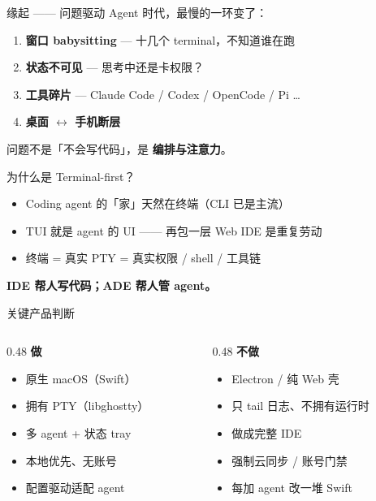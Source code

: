 \documentclass[aspectratio=169,10pt,UTF8]{ctexbeamer}
\begin{document}
\begin{frame}{缘起 —— 问题驱动}
  Agent 时代，最慢的一环变了：
  \begin{enumerate}
    \item \textbf{窗口 babysitting} — 十几个 terminal，不知道谁在跑
    \item \textbf{状态不可见} — 思考中还是卡权限？
    \item \textbf{工具碎片} — Claude Code / Codex / OpenCode / Pi \ldots
    \item \textbf{桌面 $\leftrightarrow$ 手机断层}
  \end{enumerate}
  \vspace{0.5em}
  \centering 问题不是「不会写代码」，是 \textbf{编排与注意力}。
\end{frame}

\begin{frame}{为什么是 Terminal-first？}
  \begin{itemize}
    \item Coding agent 的「家」天然在终端（CLI 已是主流）
    \item TUI 就是 agent 的 UI —— 再包一层 Web IDE 是重复劳动
    \item 终端 = 真实 PTY = 真实权限 / shell / 工具链
  \end{itemize}
  \vspace{1em}
  \centering
  \textbf{IDE 帮人写代码；ADE 帮人管 agent。}
\end{frame}

\begin{frame}{关键产品判断}
  \begin{columns}[T]
    \begin{column}{0.48\textwidth}
      \textbf{做}
      \begin{itemize}
        \item 原生 macOS（Swift）
        \item 拥有 PTY（libghostty）
        \item 多 agent + 状态 tray
        \item 本地优先、无账号
        \item 配置驱动适配 agent
      \end{itemize}
    \end{column}
    \begin{column}{0.48\textwidth}
      \textbf{不做}
      \begin{itemize}
        \item Electron / 纯 Web 壳
        \item 只 tail 日志、不拥有运行时
        \item 做成完整 IDE
        \item 强制云同步 / 账号门禁
        \item 每加 agent 改一堆 Swift
      \end{itemize}
    \end{column}
  \end{columns}
\end{frame}
\end{document}
